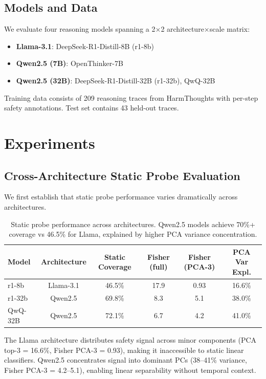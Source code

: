 \documentclass[11pt]{article}
\begin{document}
\subsection{Models and Data}

We evaluate four reasoning models spanning a 2$\times$2 architecture$\times$scale matrix:
\begin{itemize}
    \item \textbf{Llama-3.1}: DeepSeek-R1-Distill-8B (r1-8b)
    \item \textbf{Qwen2.5 (7B)}: OpenThinker-7B
    \item \textbf{Qwen2.5 (32B)}: DeepSeek-R1-Distill-32B (r1-32b), QwQ-32B
\end{itemize}

Training data consists of 209 reasoning traces from HarmThoughts with per-step safety annotations. Test set contains 43 held-out traces.

\section{Experiments}

\subsection{Cross-Architecture Static Probe Evaluation}

We first establish that static probe performance varies dramatically across architectures.

\begin{table}[h]
\centering
\caption{Static probe performance across architectures. Qwen2.5 models achieve 70\%+ coverage vs 46.5\% for Llama, explained by higher PCA variance concentration.}
\label{tab:static}
\begin{tabular}{lccccc}
\toprule
Model & Architecture & Static Coverage & Fisher (full) & Fisher (PCA-3) & PCA Var Expl. \\
\midrule
r1-8b & Llama-3.1 & 46.5\% & 17.9 & 0.93 & 16.6\% \\
r1-32b & Qwen2.5 & 69.8\% & 8.3 & 5.1 & 38.0\% \\
QwQ-32B & Qwen2.5 & 72.1\% & 6.7 & 4.2 & 41.0\% \\
\bottomrule
\end{tabular}
\end{table}

The Llama architecture distributes safety signal across minor components (PCA top-3 = 16.6\%, Fisher PCA-3 = 0.93), making it inaccessible to static linear classifiers. Qwen2.5 concentrates signal into dominant PCs (38--41\% variance, Fisher PCA-3 = 4.2--5.1), enabling linear separability without temporal context.
\end{document}
